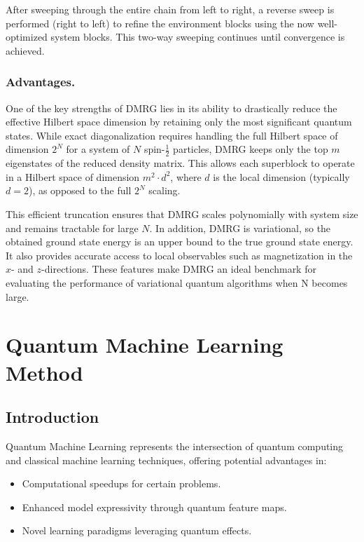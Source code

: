 \documentclass[a4paper]{article}
\begin{document}
After sweeping through the entire chain from left to right, a reverse sweep is performed (right to left) to refine the environment blocks using the now well-optimized system blocks. This two-way sweeping continues until convergence is achieved.

\subsubsection{Advantages.}
One of the key strengths of DMRG lies in its ability to drastically reduce the effective Hilbert space dimension by retaining only the most significant quantum states. While exact diagonalization requires handling the full Hilbert space of dimension $2^N$ for a system of $N$ spin-$\tfrac{1}{2}$ particles, DMRG keeps only the top $m$ eigenstates of the reduced density matrix. This allows each superblock to operate in a Hilbert space of dimension $m^2 \cdot d^2$, where $d$ is the local dimension (typically $d=2$), as opposed to the full $2^N$ scaling.

This efficient truncation ensures that DMRG scales polynomially with system size and remains tractable for large $N$. In addition, DMRG is variational, so the obtained ground state energy is an upper bound to the true ground state energy. It also provides accurate access to local observables such as magnetization in the $x$- and $z$-directions. These features make DMRG an ideal benchmark for evaluating the performance of variational quantum algorithms when N becomes large.

\section{Quantum Machine Learning Method} 
\subsection{Introduction}
Quantum Machine Learning represents the intersection of quantum computing and classical machine learning techniques, offering potential advantages in:
\begin{itemize}
    \item Computational speedups for certain problems.
    \item Enhanced model expressivity through quantum feature maps.
    \item Novel learning paradigms leveraging quantum effects.
\end{itemize}
\end{document}
